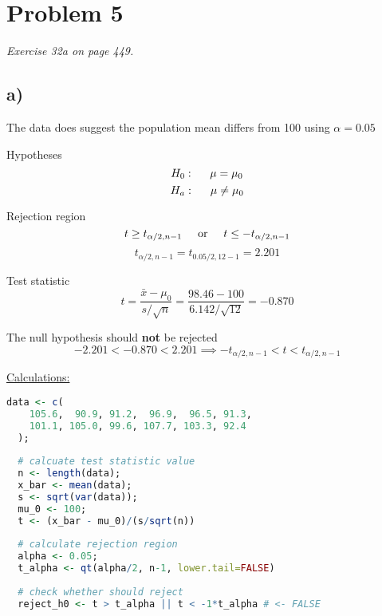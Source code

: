 \documentclass[a4paper,11pt]{article}
\begin{document}
\section*{Problem 5}
\textit{Exercise 32a on page 449.}

\subsection*{a)}

The data does suggest the population mean differs from 100 using
$\alpha = 0.05$\newline

Hypotheses
\[ H_0 : \hspace{5mm} \mu = \mu_0 \]
\[ H_a : \hspace{5mm} \mu \neq \mu_0 \]\newline

Rejection region
\[ 
  t \ge t_{\alpha/2,n-1} 
  \hspace{5mm}\text{or}\hspace{5mm} 
  t \le -t_{\alpha/2,n-1}
\]
\[ t_{\alpha/2,n-1} = t_{0.05/2,12-1} = 2.201 \]\newline

Test statistic
\[ 
  t = 
  \frac{\bar{x} - \mu_0}{s/\sqrt{n}} =
  \frac{98.46 - 100}{6.142/\sqrt{12}} =
  -0.870
\]\newline

\Large{The null hypothesis should \textbf{not} be rejected}
\[
  -2.201 < -0.870 < 2.201 \implies
  -t_{\alpha/2,n-1} < t < t_{\alpha/2,n-1}
\]\newline
\large

\clearpage
\underline{Calculations:}
\begin{lstlisting}[language=R]
  data <- c(
    105.6,  90.9, 91.2,  96.9,  96.5, 91.3,
    101.1, 105.0, 99.6, 107.7, 103.3, 92.4
  );
  
  # calcuate test statistic value
  n <- length(data);
  x_bar <- mean(data);
  s <- sqrt(var(data));
  mu_0 <- 100;
  t <- (x_bar - mu_0)/(s/sqrt(n))
  
  # calculate rejection region
  alpha <- 0.05;
  t_alpha <- qt(alpha/2, n-1, lower.tail=FALSE)
  
  # check whether should reject
  reject_h0 <- t > t_alpha || t < -1*t_alpha # <- FALSE
\end{lstlisting}
\end{document}
